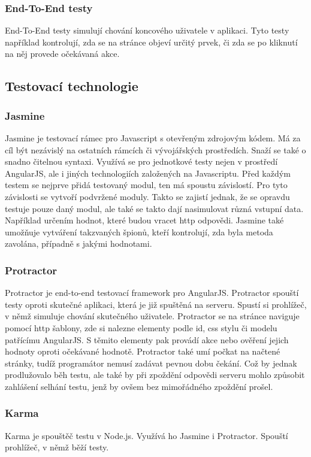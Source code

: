 \documentclass[czech,master,public,dept460,male,cpdeclaration,twoside]{diploma}
\begin{document}
\subsubsection{End-To-End testy}
End-To-End testy simulují chování koncového uživatele v aplikaci. Tyto testy například kontrolují, zda se na stránce objeví určitý prvek, či zda se po kliknutí na něj provede očekávaná akce.

\subsection{Testovací technologie}
\subsubsection{Jasmine}
Jasmine je testovací rámec pro Javascript s otevřeným zdrojovým kódem. Má za cíl být nezávislý na ostatních rámcích či vývojářských prostředích. Snaží se také o snadno čitelnou syntaxi. Využívá se pro jednotkové testy nejen v prostředí AngularJS, ale i jiných technologiích založených na Javascriptu. Před každým testem se nejprve přidá testovaný modul, ten má spoustu závislostí. Pro tyto závislosti se vytvoří podvržené moduly. Takto se zajistí jednak, že se opravdu testuje pouze daný modul, ale také se takto dají nasimulovat různá vstupní data. Například určením hodnot, které budou vracet http odpovědi. Jasmine také umožňuje vytváření takzvaných špionů, kteří kontrolují, zda byla metoda zavolána, případně s jakými hodnotami.\cite{testingANG}

\subsubsection{Protractor}
Protractor je end-to-end testovací framework pro AngularJS. Protractor spouští testy oproti skutečné aplikaci, která je již spuštěná na serveru. Spustí si prohlížeč, v němž simuluje chování skutečného uživatele. Protractor se na stránce naviguje pomocí http šablony, zde si nalezne elementy podle id, css stylu či modelu patřícímu AngularJS. S těmito elementy pak provádí akce nebo ověření jejich hodnoty oproti očekávané hodnotě. Protractor také umí počkat na načtené stránky, tudíž programátor nemusí zadávat pevnou dobu čekání. Což by jednak prodlužovalo běh testu, ale také by při zpoždění odpovědi serveru mohlo způsobit zahlášení selhání testu, jenž by ovšem bez mimořádného zpoždění prošel. \cite{testingANG}

\subsubsection{Karma}
Karma je spouštěč testu v Node.js. Využívá ho Jasmine i Protractor. Spouští prohlížeč, v němž běží testy.
\end{document}

